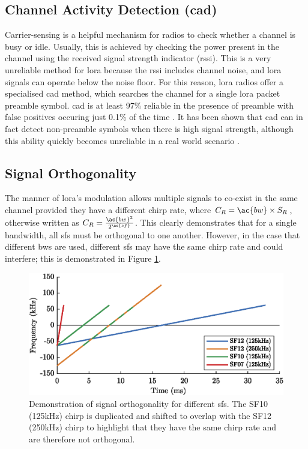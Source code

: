 \subsection{Channel Activity Detection (\ac{cad})}\label{sec:cad}
Carrier-sensing is a helpful mechanism for radios to check whether a channel is busy or idle. Usually, this is achieved by checking the power present in the channel using the received signal strength indicator (\ac{rssi}). This is a very unreliable method for \ac{lora} because the \ac{rssi} includes channel noise, and \ac{lora} signals can operate below the noise floor. For this reason, \ac{lora} radios offer a specialised \ac{cad} method, which searches the channel for a single \ac{lora} packet preamble symbol. \ac{cad} is at least 97\% reliable in the presence of preamble with false positives occuring just 0.1\% of the time \cite{3YP:LORA_FOR_IOT}. It has been shown that \ac{cad} can in fact detect non-preamble symbols when there is high signal strength, although this ability quickly becomes unreliable in a real world scenario \cite{3YP:LORA_CSMA}.

\subsection{Signal Orthogonality}
The manner of \ac{lora}'s modulation allows multiple signals to co-exist in the same channel provided they have a different chirp rate, where $C_R = \ac{bw} \times S_R$, otherwise written as $C_R = \frac{\ac{bw}^2}{2^{\ac{sf}}}$. This clearly demonstrates that for a single bandwidth, all \ac{sf}s must be orthogonal to one another. However, in the case that different \ac{bw}s are used, different \ac{sf}s may have the same chirp rate and could interfere; this is demonstrated in Figure \ref{fig:orthogonality}.

\begin{figure}[H]
    \centering
   	\includegraphics{Figures/sf_orthogonality_plot.eps}
    \caption[Signal chirp rate orthogonality]{
    Demonstration of signal orthogonality for different \ac{sf}s. The SF10 (125kHz) chirp is duplicated and shifted to overlap with the  SF12 (250kHz) chirp to highlight that they have the same chirp rate and are therefore not orthogonal.
    }
    \label{fig:orthogonality}
\end{figure}

